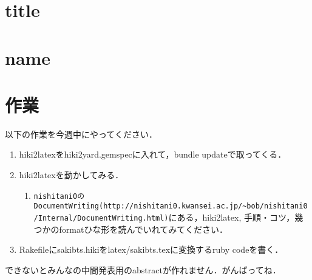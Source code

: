 \documentclass[10pt,a4j,twocolumn]{jsarticle}
\begin{document}
\section{title}
\section{name}
\section{作業}
以下の作業を今週中にやってください．
\begin{enumerate}
\item hiki2latexをhiki2yard.gemspecに入れて，bundle updateで取ってくる．
\item hiki2latexを動かしてみる．\begin{enumerate}
\item \verb|nishitani0のDocumentWriting(http://nishitani0.kwansei.ac.jp/~bob/nishitani0/Internal/DocumentWriting.html)|にある，hiki2latex, 手順・コツ，幾つかのformatひな形を読んでいれてみてください．
\end{enumerate}
\item Rakefileにsakibts.hikiをlatex/sakibts.texに変換するruby codeを書く．
\end{enumerate}
できないとみんなの中間発表用のabstractが作れません．がんばってね．
\end{document}
